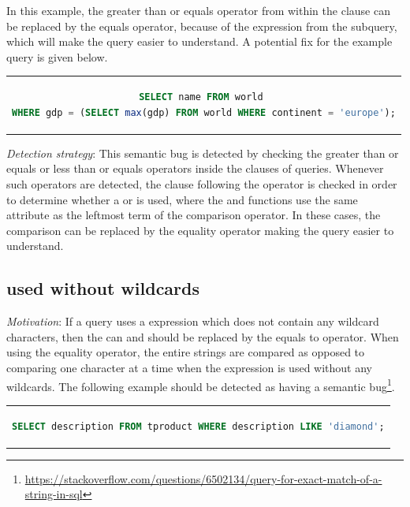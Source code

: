 In this example, the greater than or equals operator from within the  clause can be replaced by the equals operator, because of the  expression from the subquery, which will make the query easier to understand. A potential fix for the example query is given below.

\begin{center}
\begin{tabular}{c}
\begin{lstlisting}[language=SQL]
SELECT name FROM world 
WHERE gdp = (SELECT max(gdp) FROM world WHERE continent = 'europe');
\end{lstlisting}
\end{tabular}
\end{center}

\noindent \emph{Detection strategy}: This semantic bug is detected by checking the greater than or equals or less than or equals operators inside the  clauses of queries. Whenever such operators are detected, the clause following the operator is checked in order to determine whether a  or  is used, where the  and  functions use the same attribute as the leftmost term of the comparison operator. In these cases, the comparison can be replaced by the equality operator making the query easier to understand.

\subsection{ used without wildcards}
\emph{Motivation}: If a query uses a  expression which does not contain any wildcard characters, then the  can and should be replaced by the equals to operator. When using the equality operator, the entire strings are compared as opposed to comparing one character at a time when the  expression is used without any wildcards. The following example should be detected as having a semantic bug\footnote{\url{https://stackoverflow.com/questions/6502134/query-for-exact-match-of-a-string-in-sql}}.

\begin{center}
\begin{tabular}{c}
\begin{lstlisting}[language=SQL]
SELECT description FROM tproduct WHERE description LIKE 'diamond';
\end{lstlisting}
\end{tabular}
\end{center}

